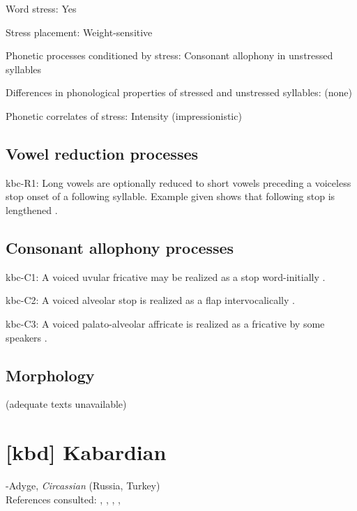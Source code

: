 {\begin{appendixdesc}
\item[Word stress:] Yes

\item[Stress placement:] Weight-sensitive

\item[Phonetic processes conditioned by stress:] Consonant allophony in unstressed syllables

\item[Differences in phonological properties of stressed and unstressed syllables:] (none)

\item[Phonetic correlates of stress:] Intensity (impressionistic)
\end{appendixdesc}
\subsection*{Vowel reduction processes}
\begin{appendixdesc}

\item[kbc-R1:] Long vowels are optionally reduced to short vowels preceding a voiceless stop onset of a following syllable. Example given shows that following stop is lengthened \citep[17]{Sandalo1997}.
\end{appendixdesc}
\subsection*{Consonant allophony processes}
\begin{appendixdesc}

\item[kbc-C1:] A voiced uvular fricative may be realized as a stop word-initially \citep[16]{Sandalo1997}.

\item[kbc-C2:] A voiced alveolar stop is realized as a flap intervocalically \citep[16]{Sandalo1997}.

\item[kbc-C3:] A voiced palato-alveolar affricate is realized as a fricative by some speakers \citep[15--16]{Sandalo1997}.
\end{appendixdesc}
\subsection*{Morphology}

(adequate texts unavailable)

\section*{[kbd] Kabardian}  %
-Adyge, \textit{Circassian} (Russia, Turkey)\medskip\\
References consulted: \citet{Applebaum2013}, \citet{Colarusso2006}, \citet{GordonApplebaum2010}, \citet{Kuipers1960}, \citet{Matasović2010}

}

